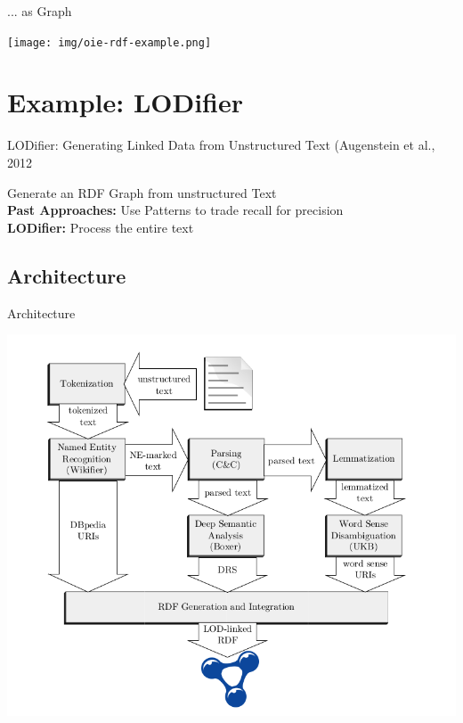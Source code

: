 \documentclass[11pt]{beamer}
\begin{document}
		\begin{frame}{... as Graph}
			\begin{center}
				\texttt{[image: img/oie-rdf-example.png]}
			\end{center}			
		\end{frame}

\section{Example: LODifier}
	\begin{frame}{LODifier: Generating Linked Data from Unstructured Text (Augenstein et al., 2012}
		\begin{center}
			Generate an RDF Graph from unstructured Text\\
			\vspace{15pt}
			\textbf{Past Approaches:} Use Patterns to trade recall for precision\\
			\textbf{LODifier:} Process the entire text
		\end{center}
	\end{frame}
	\subsection{Architecture}
		\begin{frame}{Architecture}
			\begin{center}
				\includegraphics[scale=0.25]{img/oie-lodifier-architecture.png}
			\end{center}
		\end{frame}
		
\end{document}
